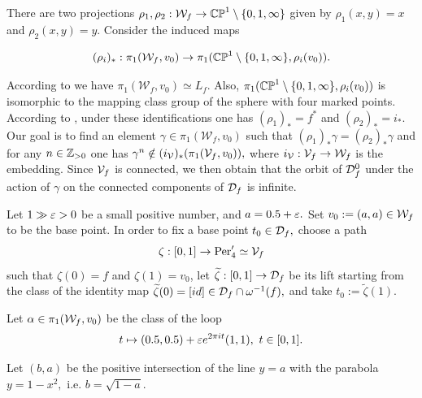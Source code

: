 \documentclass{article}
\begin{document}
There are two projections $\rho_1,\rho_2: \mathcal{W}_f\to \mathbb{CP}^1\setminus\{0,1,\infty\}$ given by $\rho_1(x,y)=x$ and $\rho_2(x,y)=y.$ Consider the induced maps

\begin{equation*}
    (\rho_i)_*:\pi_1(\mathcal{W}_f,v_0)\to \pi_1(\mathbb{CP}^1\setminus\{0,1,\infty\},\rho_i(v_0)).
\end{equation*}

According to \cite{HK} we have $\pi_1(\mathcal{W}_f,v_0)\simeq L_f.$ Also, $\pi_1(\mathbb{CP}^1\setminus\{0,1,\infty\},\rho_i(v_0))$ is isomorphic to the mapping class group of the sphere with four marked points. According to \cite{HK}, under these identifications one has $(\rho_1)_*=f^*$ and $(\rho_2)_*=i_*.$ Our goal is to find an element $\gamma\in\pi_1(\mathcal{W}_f,v_0)$ such that $(\rho_1)_*\gamma=(\rho_2)_*\gamma$ and for any $n\in\mathbb{Z}_{>0}$ one has $\gamma^n\notin (i_{\mathcal{V}})_*(\pi_1(\mathcal{V}_f,v_0)),$ where $i_{\mathcal{V}}:\mathcal{V}_f\to\mathcal{W}_f$ is the embedding. Since $\mathcal{V}_f$ is connected, we then obtain that the orbit of $\mathcal{D}_f^0$ under the action of $\gamma$ on the connected components of $\mathcal{D}_f$ is infinite.

Let $1\gg \varepsilon>0$ be a small positive number, and $a=0.5+\varepsilon.$ Set $v_0:=(a,a)\in\mathcal{W}_f$ to be the base point. In order to fix a base point $t_0\in\mathcal{D}_f,$ choose a path
$$
\zeta:[0,1]\to \operatorname{Per}'_4\simeq \mathcal{V}_f
$$
such that $\zeta(0)=f$ and $\zeta(1)=v_0$, let $\widetilde{\zeta}:[0,1]\to\mathcal{D}_f$ be its lift starting from the class of the identity map $\widetilde{\zeta}(0)=[id]\in\mathcal{D}_f\cap\omega^{-1}(f),$ and take $t_0:=\widetilde{\zeta}(1).$ 


\begin{definition}\label{def:alpha}
    Let $\alpha\in\pi_1(\mathcal{W}_f,v_0)$ be the class of the loop
$$
t \mapsto (0.5,0.5)+\varepsilon e^{2\pi i t}(1,1),\ t\in [0,1].
$$
\end{definition}

Let $(b,a)$ be the positive intersection of the line $y=a$ with the parabola $y=1-x^2,$ i.e. $b=\sqrt{1-a}.$
\end{document}
